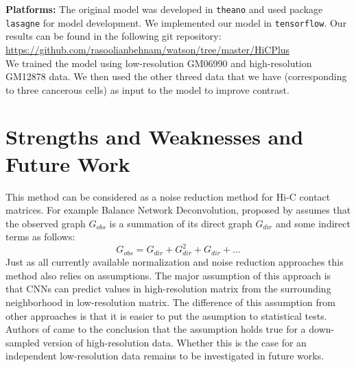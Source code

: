 \documentclass{article}
\begin{document}
\textbf{Platforms:}
The original model was developed in \texttt{theano}
and used package \texttt{lasagne} for model development.
We implemented our model in \texttt{tensorflow}. Our 
results can be found in the following git repository:\\
\url{https://github.com/rasoolianbehnam/watson/tree/master/HiCPlus}\\

We trained the model using low-resolution 
 GM06990 and high-resolution
 GM12878 data. We then used the other threed
 data that we have (corresponding to three
 cancerous cells) as input to the model to 
 improve contrast.
\section{Strengths and Weaknesses and Future Work}
This method can be considered as a noise reduction method
for Hi-C contact matrices. 
For example Balance Network Deconvolution,
proposed by \cite{feizi2013network}
assumes that the observed graph $G_{obs}$ is a summation of its
direct graph $G_{dir}$ and some indirect terms as follows:
\begin{equation}
        \label{indirect_effects}
            G_{obs} = G_{dir} + G_{dir}^2 + G_{dir} + ...
\end{equation}
Just as all currently available
normalization and noise reduction approaches this method
also relies on assumptions. The major assumption of this
approach is that CNNs can predict values in high-resolution
matrix from the surrounding neighborhood in low-resolution
matrix. The difference of this assumption from other 
approaches is that it is easier to put the asumption to
statistical tests. Authors of \cite{zhang2018enhancing}
came to the conclusion that the assumption holds true for
a down-sampled version of high-resolution data. Whether
this is the case for an independent low-resolution data
remains to be investigated in future works.





\begin{acronym}
\end{acronym}
\end{document}
